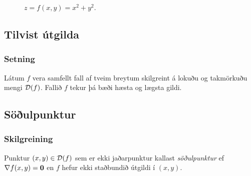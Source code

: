 \begin{figure}[!h]
\begin{minipage}{.5\textwidth}
            \caption*{$z= f(x,y) = x^2+y^2$.}
        \end{minipage}
    \end{figure}





\subsection{Tilvist útgilda} 

\subsubsection{Setning  }
Látum $f$ vera samfellt fall af tveim breytum
skilgreint á lokuðu og takmörkuðu mengi ${\cal D}(f)$.  Fallið $f$
  tekur þá bæði hæsta og lægsta gildi. 






\subsection{Söðulpunktur} 

\subsubsection{Skilgreining  }
 Punktur $(x,y)\in  {\cal D}(f)$ sem er ekki
jaðarpunktur kallast {\em \color{red} söðulpunktur} ef $\nabla f(x,y)=\mbox{${\bf 0}$}$ en $f$
hefur ekki staðbundið útgildi í $(x,y)$.




